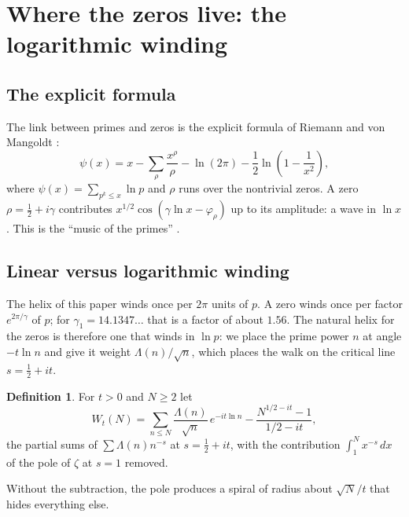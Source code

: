 \documentclass[11pt,a4paper]{article}
\theoremstyle{remark}
\theoremstyle{definition}
\newtheorem{definition}{Definition}
\begin{document}
\section{Where the zeros live: the logarithmic winding}\label{sec:zeros}

\subsection{The explicit formula}
The link between primes and zeros is the explicit formula of Riemann and von Mangoldt \cite{riemann,mangoldt,davenport}:
\begin{equation}
\psi(x)=x-\sum_\rho\frac{x^\rho}{\rho}-\ln(2\pi)-\frac12\ln\!\left(1-\frac1{x^2}\right),
\end{equation}
where $\psi(x)=\sum_{p^k\le x}\ln p$ and $\rho$ runs over the nontrivial zeros. A zero $\rho=\frac12+i\gamma$ contributes $x^{1/2}\cos(\gamma\ln x-\varphi_\rho)$ up to its amplitude: a wave in $\ln x$. This is the ``music of the primes'' \cite{dusautoy,berrykeating}.

\subsection{Linear versus logarithmic winding}
The helix of this paper winds once per $2\pi$ units of $p$. A zero winds once per factor $e^{2\pi/\gamma}$ of $p$; for $\gamma_1=14.1347\ldots$ that is a factor of about $1.56$. The natural helix for the zeros is therefore one that winds in $\ln p$: we place the prime power $n$ at angle $-t\ln n$ and give it weight $\Lambda(n)/\sqrt n$, which places the walk on the critical line $s=\frac12+it$.

\begin{definition}
For $t>0$ and $N\ge2$ let
\begin{equation}\label{eq:walk}
W_t(N)=\sum_{n\le N}\frac{\Lambda(n)}{\sqrt n}\,e^{-it\ln n}-\frac{N^{1/2-it}-1}{1/2-it},
\end{equation}
the partial sums of $\sum\Lambda(n)n^{-s}$ at $s=\frac12+it$, with the contribution $\int_1^Nx^{-s}\,dx$ of the pole of $\zeta$ at $s=1$ removed.
\end{definition}

Without the subtraction, the pole produces a spiral of radius about $\sqrt N/t$ that hides everything else.
\end{document}
